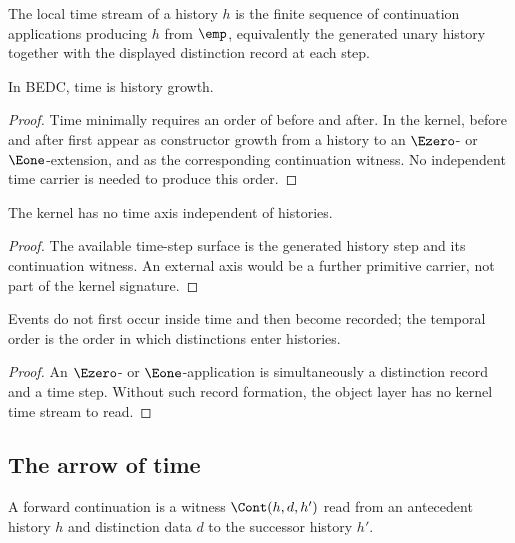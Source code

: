\begin{definition}
\label{def:philosophy-local-time-stream}
The local time stream of a history \(h\) is the finite sequence of
continuation applications producing \(h\) from \(\emp\), equivalently
the generated unary history together with the displayed distinction
record at each step.
\end{definition}

\begin{theorem}
\label{thm:philosophy-time-is-history-growth}
In BEDC, time is history growth.
\end{theorem}
\begin{proof}
Time minimally requires an order of before and after. In the kernel,
before and after first appear as constructor growth from a history to
an \(\Ezero\)- or \(\Eone\)-extension, and as the corresponding
continuation witness. No independent time carrier is needed to produce
this order.
\end{proof}

\begin{corollary}
\label{cor:philosophy-no-external-time-axis}
The kernel has no time axis independent of histories.
\end{corollary}
\begin{proof}
The available time-step surface is the generated history step and its
continuation witness. An external axis would be a further primitive
carrier, not part of the kernel signature.
\end{proof}

\begin{corollary}
\label{cor:philosophy-time-not-event-container}
Events do not first occur inside time and then become recorded; the
temporal order is the order in which distinctions enter histories.
\end{corollary}
\begin{proof}
An \(\Ezero\)- or \(\Eone\)-application is simultaneously a distinction
record and a time step. Without such record formation, the object layer
has no kernel time stream to read.
\end{proof}

\subsection{The arrow of time}
\label{subsec:philosophy-arrow-of-time}

\begin{definition}
\label{def:philosophy-forward-continuation}
A forward continuation is a witness \(\Cont(h,d,h')\) read from an
antecedent history \(h\) and distinction data \(d\) to the successor
history \(h'\).
\end{definition}

